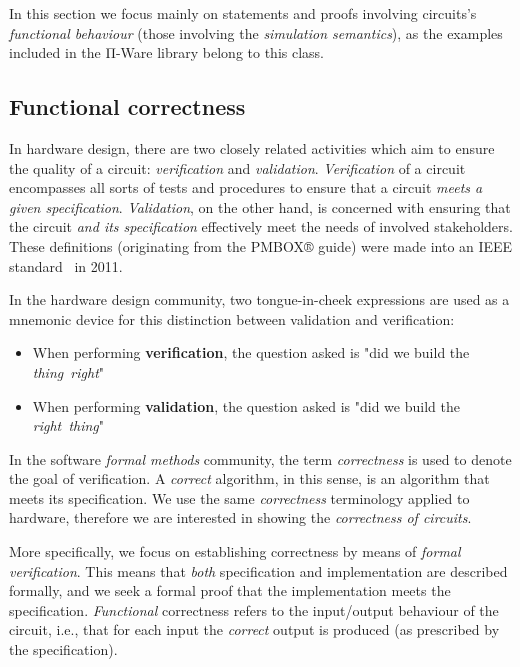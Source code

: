         In this section we focus mainly on statements and proofs involving circuits's
        \emph{functional behaviour} (those involving the \emph{simulation semantics}),
        as the examples included in the Π-Ware library belong to this class.


        \subsection{Functional correctness}
        \label{subsec:functional-correctness}
            In hardware design, there are two closely related activities which aim to ensure the
            quality of a circuit: \emph{verification} and \emph{validation}.
            \emph{Verification} of a circuit encompasses all sorts of tests and procedures to ensure that
            a circuit \emph{meets a given specification}.
            \emph{Validation}, on the other hand, is concerned with ensuring that the circuit
            \emph{and its specification} effectively meet the needs of involved stakeholders.
            These definitions (originating from the PMBOX® guide) were made into an
            IEEE standard~\cite{ieee-pmbok} in 2011.

            In the hardware design community, two tongue-in-cheek expressions are used
            as a mnemonic device for this distinction between validation and verification:

            \begin{itemize}
                \item When performing \textbf{verification},
                    the question asked is "did we build the \emph{thing~right}"
                \item When performing \textbf{validation},
                    the question asked is "did we build the \emph{right~thing}"
            \end{itemize}

            In the software \emph{formal methods} community,
            the term \emph{correctness} is used to denote the goal of verification.
            A \emph{correct} algorithm, in this sense, is an algorithm that meets its specification.
            We use the same \emph{correctness} terminology applied to hardware, therefore
            we are interested in showing the \emph{correctness of circuits}.

            More specifically, we focus on establishing correctness by means of \emph{formal verification}.
            This means that \emph{both} specification and implementation are described formally,
            and we seek a formal proof that the implementation meets the specification.
            \emph{Functional} correctness refers to the input/output behaviour of the circuit, i.e.,
            that for each input the \emph{correct} output is produced (as prescribed by the specification).

